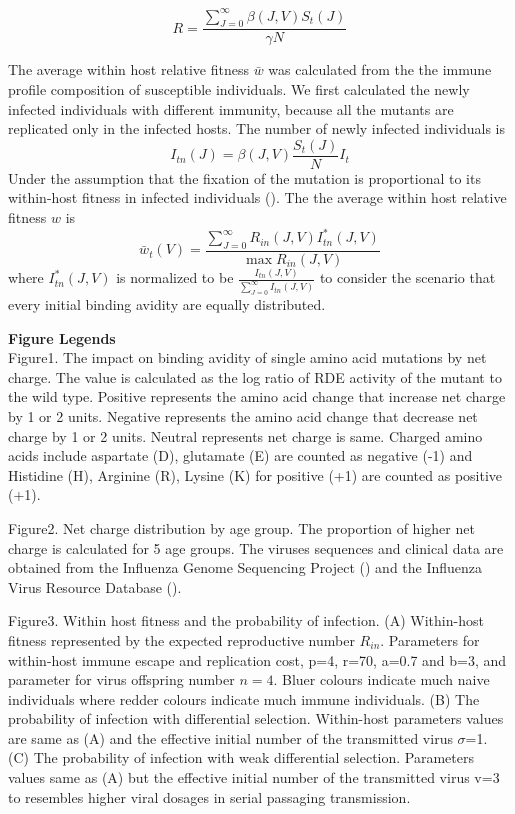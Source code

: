 \documentclass[12pt,a4paper]{article}
\begin{document}
\begin{equation}
R=\frac{\sum_{J=0}^{\infty}\beta(J,V)S_{t}(J)}{\gamma N}
\end{equation}

The average within host relative fitness $\bar{w}$ was calculated from the the immune profile composition of susceptible individuals. We first calculated the newly infected individuals with different immunity, because all the mutants are replicated only in the infected hosts. The number of newly infected individuals is
\begin{equation}
I_{tn}(J) = \beta(J,V)\frac{S_{t}(J)}{N} {I_{t}}
\end{equation}
Under the assumption that the fixation of the mutation is proportional to its within-host fitness in infected individuals (\cite{Gillespie1984}). The the average within host relative fitness $w$ is
\begin{equation}
\bar{w}_{t}(V)=\frac{\sum_{J=0}^{\infty} R_{in}(J,V)I_{tn}^*(J,V)}{\max{R_{in}(J,V)}}
\end{equation}
where $I_{tn}^*(J,V)$ is normalized to be $\frac{I_{tn}(J,V)}{\sum_{J=0}^{\infty}I_{tn}(J,V)}$ to consider the scenario that every initial binding avidity are equally distributed.

\clearpage

{\bf Figure Legends} \\
Figure1. The impact on binding avidity of single amino acid mutations by net charge. The value is calculated as the log ratio of RDE activity of the mutant to the wild type. Positive represents the amino acid change that increase net charge by 1 or 2 units. Negative represents the amino acid change that decrease net charge by 1 or 2 units. Neutral represents net charge is same. Charged amino acids include aspartate (D), glutamate (E) are counted as negative (-1) and Histidine (H), Arginine (R), Lysine (K) for positive (+1) are counted as positive (+1).
 
Figure2. Net charge distribution by age group. The proportion of higher net charge is calculated for 5 age groups. The viruses sequences and clinical data are obtained from the Influenza Genome Sequencing Project (\cite{Ghedin2005}) and the Influenza Virus Resource Database (\cite{Bao2008}). 

Figure3. Within host fitness and the probability of infection. (A) Within-host fitness represented by the expected reproductive number $R_{in}$. Parameters for within-host immune escape and replication cost, p=4, r=70, a=0.7 and b=3, and parameter for virus offspring number $n=4$. Bluer colours indicate much naive individuals where redder colours indicate much immune individuals. (B) The probability of infection with differential selection. Within-host parameters values are same as (A) and the effective initial number of the transmitted virus $\sigma$=1. (C) The probability of infection with weak differential selection. Parameters values same as (A) but the effective initial number of the transmitted virus v=3 to resembles higher viral dosages in serial passaging transmission.
\end{document}
